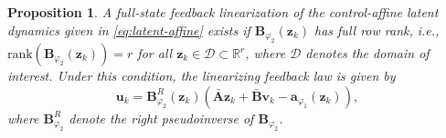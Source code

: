\documentclass{article}
\newtheorem{proposition}{Proposition}
\begin{document}
\begin{proposition}
\label{prop:cond-FL}
A full-state feedback linearization of the control-affine latent dynamics given in \eqref{eq:latent-affine} exists if $\mathbf{B}_{\varphi_2}(\mathbf{z}_k)$ has full row rank, i.e., $\text{rank}(\mathbf{B}_{\varphi_2}(\mathbf{z}_k))=r$ for all $\mathbf{z}_k \in \mathcal{D} \subset \mathbb{R}^r$, where $\mathcal{D}$ denotes the domain of interest.
Under this condition, the linearizing feedback law is given by
\begin{equation}
    \label{eq:linearizing-law}
    \mathbf{u}_k = \mathbf{B}^{R}_{\varphi_2}(\mathbf{z}_k)(\bar{\mathbf{A}}\mathbf{z}_{k} + \bar{\mathbf{B}}\mathbf{v}_k - \mathbf{a}_{\varphi_1}(\mathbf{z}_k)),
\end{equation}
where $\mathbf{B}^{R}_{\varphi_2}$ denote the right pseudoinverse of $\mathbf{B}_{\varphi_2}$.
\end{proposition}
\end{document}

